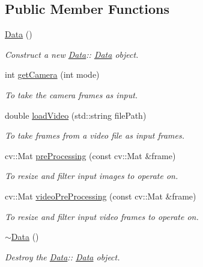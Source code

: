 \subsection*{Public Member Functions}
\begin{DoxyCompactItemize}
\item 
\mbox{\label{classData_af11f741cb7f587e2e495452a8905a22a}} 
\hyperlink{classData_af11f741cb7f587e2e495452a8905a22a}{Data} ()
\begin{DoxyCompactList}\small\item\em Construct a new \hyperlink{classData}{Data}\+:\+: \hyperlink{classData}{Data} object. \end{DoxyCompactList}\item 
int \hyperlink{classData_a511184f11597e720b0bf96b9b4f89a0b}{get\+Camera} (int mode)
\begin{DoxyCompactList}\small\item\em To take the camera frames as input. \end{DoxyCompactList}\item 
double \hyperlink{classData_a9875eec4b1ee3fc18512e5721513d34e}{load\+Video} (std\+::string file\+Path)
\begin{DoxyCompactList}\small\item\em To take frames from a video file as input frames. \end{DoxyCompactList}\item 
cv\+::\+Mat \hyperlink{classData_a8791dd62b1f57b4e4f2039e934ec7fdf}{pre\+Processing} (const cv\+::\+Mat \&frame)
\begin{DoxyCompactList}\small\item\em To resize and filter input images to operate on. \end{DoxyCompactList}\item 
cv\+::\+Mat \hyperlink{classData_ab0eefc277a688a36ec7bef63e8807bc2}{video\+Pre\+Processing} (const cv\+::\+Mat \&frame)
\begin{DoxyCompactList}\small\item\em To resize and filter input video frames to operate on. \end{DoxyCompactList}\item 
\mbox{\label{classData_aab31956423290f0d62dcca47ab4d16dd}} 
\hyperlink{classData_aab31956423290f0d62dcca47ab4d16dd}{$\sim$\+Data} ()
\begin{DoxyCompactList}\small\item\em Destroy the \hyperlink{classData}{Data}\+:\+: \hyperlink{classData}{Data} object. \end{DoxyCompactList}\end{DoxyCompactItemize}
